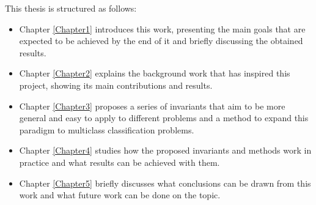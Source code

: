 This thesis is structured as follows:

\begin{itemize}
    \item Chapter \ref{Chapter1} introduces this work, presenting the main goals that are expected
    to be achieved by the end of it and briefly discussing the obtained results.
    \item Chapter \ref{Chapter2} explains the background work that has inspired this project,
    showing its main contributions and results.
    \item Chapter \ref{Chapter3} proposes a series of invariants that aim to be more general and easy
    to apply to different problems and a method to expand this paradigm to multiclass classification
    problems.
    \item Chapter \ref{Chapter4} studies how the proposed invariants and methods work in practice
    and what results can be achieved with them.
    \item Chapter \ref{Chapter5} briefly discusses what conclusions can be drawn from this work
    and what future work can be done on the topic.
\end{itemize}

